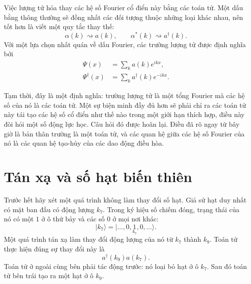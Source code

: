 Việc lượng tử hóa thay các hệ số Fourier cổ điển này bằng các toán tử. Một dấu bằng thông thường sẽ đồng nhất các đối tượng thuộc những loại khác nhau, nên tốt hơn là viết một quy tắc thay thế:
\begin{equation}
\alpha(k)\rightsquigarrow a(k),
\qquad
\alpha^*(k)\rightsquigarrow a^\dagger(k).
\end{equation}
Với một lựa chọn nhất quán về dấu Fourier, các trường lượng tử được định nghĩa bởi
\begin{align}
\Psi(x)&=\sum_k a(k)e^{ikx},\\
\Psi^\dagger(x)&=\sum_k a^\dagger(k)e^{-ikx}.
\end{align}

Tạm thời, đây là một định nghĩa: trường lượng tử là một tổng Fourier mà các hệ số của nó là các toán tử. Một sự biện minh đầy đủ hơn sẽ phải chỉ ra các toán tử này tái tạo các hệ số cổ điển như thế nào trong một giới hạn thích hợp, điều này đòi hỏi một số động lực học. Câu hỏi đó được hoãn lại. Điều đã rõ ngay từ bây giờ là bản thân trường là một toán tử, và các quan hệ giữa các hệ số Fourier của nó là các quan hệ tạo-hủy của các dao động điều hòa.

\begin{classroomqa}
\end{classroomqa}

\section{Tán xạ và số hạt biến thiên}

Trước hết hãy xét một quá trình không làm thay đổi số hạt. Giả sử hạt duy nhất có mặt ban đầu có động lượng \(k_7\). Trong ký hiệu số chiếm đóng, trạng thái của nó có một \(1\) ở ô thứ bảy và các số 0 ở mọi nơi khác:
\begin{equation}
|k_7\rangle
=
|\ldots,0,\underset{k_7}{1},0,\ldots\rangle.
\end{equation}
Một quá trình tán xạ làm thay đổi động lượng của nó từ \(k_7\) thành \(k_9\). Toán tử thực hiện đúng sự thay đổi này là
\begin{equation}
a^\dagger(k_9)a(k_7).
\end{equation}
Toán tử ở ngoài cùng bên phải tác động trước: nó loại bỏ hạt ở ô \(k_7\). Sau đó toán tử bên trái tạo ra một hạt ở ô \(k_9\).

